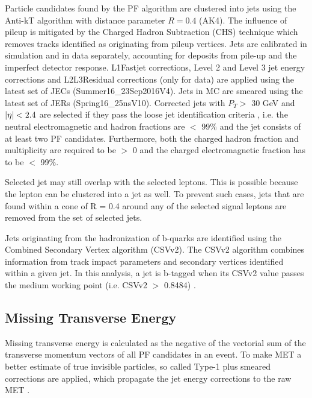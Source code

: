 Particle candidates found by the PF algorithm are clustered into jets using the Anti-kT algorithm
 with distance parameter $R =0.4$ (AK4). The influence of pileup is mitigated by the Charged
Hadron Subtraction (CHS) technique which removes tracks identified as originating from pileup vertices. Jets are calibrated
in simulation and in data separately, accounting for deposits from pile-up and the imperfect
detector response.
L1Fastjet corrections, Level 2 and Level 3 jet energy corrections and L2L3Residual corrections (only for data) are applied using the latest set of JECs (Summer16\_23Sep2016V4).
Jets in MC are smeared using the latest set of JERs (Spring16\_25nsV10).
Corrected jets with $P_{T} >$ 30 GeV and $|{\eta}| <2.4$ are selected if they pass the
loose jet identification criteria \cite{jetid}, i.e. the neutral electromagnetic and hadron fractions are
 $<$ 99\% and the jet consists of at least two PF candidates. Furthermore, both the charged hadron
fraction and multiplicity are required to be $>$ 0 and the charged electromagnetic fraction has to be $<$ 99\%.

Selected jet may still overlap with the selected leptons. This is possible because the lepton
can be clustered into a jet as well. To prevent such cases, jets that are found within a cone of
R = 0.4 around any of the selected signal leptons are removed from the set of selected jets.

Jets originating from the hadronization of b-quarks are identified using the Combined Secondary Vertex algorithm (CSVv2). The CSVv2 algorithm combines information from track impact parameters and secondary vertices identified within a given jet. In this analysis, a jet is
b-tagged when its CSVv2 value passes the medium working point (i.e. CSVv2 $>$ 0.8484) \cite{bjet}.


\subsection{Missing Transverse Energy}

Missing transverse energy is calculated as the negative of the vectorial sum of the transverse
momentum vectors of all PF candidates in an event. To make MET a better estimate of true
invisible particles, so called Type-1 plus smeared corrections are applied, which propagate the jet energy
corrections to the raw MET \cite{metcor}.


